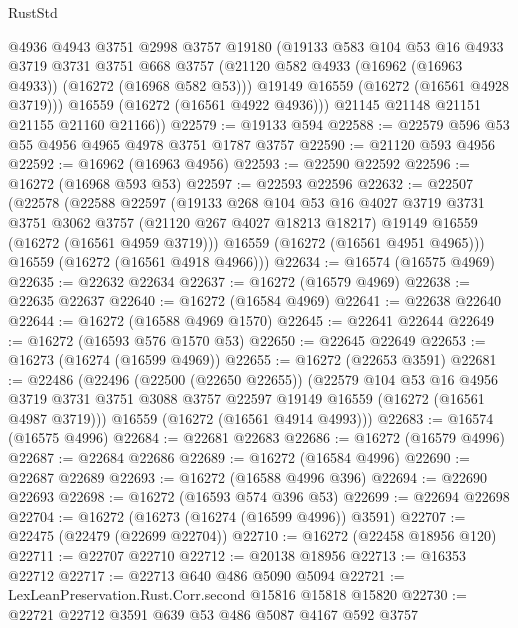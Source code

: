 \begin{lexlean}{RustStd}
\begin{coremodule}
          @4936
          @4943
          @3751
          @2998
          @3757
          @19180
          (@19133
            @583
            @104
            @53
            @16
            @4933
            @3719
            @3731
            @3751
            @668
            @3757
            (@21120 @582 @4933 (@16962 (@16963 @4933)) (@16272 (@16968 @582 @53)))
            @19149
            @16559
            (@16272 (@16561 @4928 @3719)))
          @16559
          (@16272 (@16561 @4922 @4936)))
        @21145
        @21148
        @21151
        @21155
        @21160
        @21166))
@22579 := @19133 @594
@22588 := @22579 @596 @53 @55 @4956 @4965 @4978 @3751 @1787 @3757
@22590 := @21120 @593 @4956
@22592 := @16962 (@16963 @4956)
@22593 := @22590 @22592
@22596 := @16272 (@16968 @593 @53)
@22597 := @22593 @22596
@22632 := @22507
    (@22578
      (@22588
        @22597
        (@19133
          @268
          @104
          @53
          @16
          @4027
          @3719
          @3731
          @3751
          @3062
          @3757
          (@21120 @267 @4027 @18213 @18217)
          @19149
          @16559
          (@16272 (@16561 @4959 @3719)))
        @16559
        (@16272 (@16561 @4951 @4965)))
      @16559
      (@16272 (@16561 @4918 @4966)))
@22634 := @16574 (@16575 @4969)
@22635 := @22632 @22634
@22637 := @16272 (@16579 @4969)
@22638 := @22635 @22637
@22640 := @16272 (@16584 @4969)
@22641 := @22638 @22640
@22644 := @16272 (@16588 @4969 @1570)
@22645 := @22641 @22644
@22649 := @16272 (@16593 @576 @1570 @53)
@22650 := @22645 @22649
@22653 := @16273 (@16274 (@16599 @4969))
@22655 := @16272 (@22653 @3591)
@22681 := @22486
    (@22496
      (@22500 (@22650 @22655))
      (@22579
        @104
        @53
        @16
        @4956
        @3719
        @3731
        @3751
        @3088
        @3757
        @22597
        @19149
        @16559
        (@16272 (@16561 @4987 @3719)))
      @16559
      (@16272 (@16561 @4914 @4993)))
@22683 := @16574 (@16575 @4996)
@22684 := @22681 @22683
@22686 := @16272 (@16579 @4996)
@22687 := @22684 @22686
@22689 := @16272 (@16584 @4996)
@22690 := @22687 @22689
@22693 := @16272 (@16588 @4996 @396)
@22694 := @22690 @22693
@22698 := @16272 (@16593 @574 @396 @53)
@22699 := @22694 @22698
@22704 := @16272 (@16273 (@16274 (@16599 @4996)) @3591)
@22707 := @22475 (@22479 (@22699 @22704))
@22710 := @16272 (@22458 @18956 @120)
@22711 := @22707 @22710
@22712 := @20138 @18956
@22713 := @16353 @22712
@22717 := @22713 @640 @486 @5090 @5094
@22721 := LexLeanPreservation.Rust.Corr.second @15816 @15818 @15820
@22730 := @22721 @22712 @3591 @639 @53 @486 @5087 @4167 @592 @3757

\end{coremodule}
\end{lexlean}
